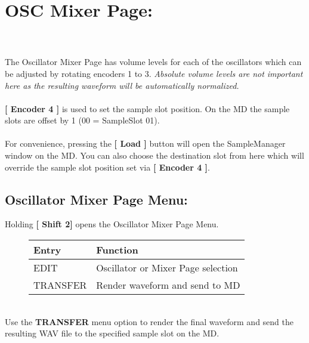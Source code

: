 \section{OSC Mixer Page:}
\\\\
The Oscillator Mixer Page has volume levels for each of the oscillators which can be adjusted by rotating encoders 1 to 3. \textit{Absolute volume levels are not important here as the resulting waveform will be automatically normalized.}\\
\\\textbf{[ Encoder 4 ]} is used to set the sample slot position. On the MD the sample slots are offset by 1 (00 = SampleSlot 01).\\
\\
For convenience, pressing the \textbf{[ Load ]} button will open the SampleManager window on the MD. You can also choose the destination slot from here which will override the sample slot position set via \textbf{[ Encoder 4 ]}.

\newpage
\subsection{Oscillator Mixer Page Menu:}
Holding \textbf{[ Shift 2]} opens the Oscillator Mixer Page Menu.
\begin{figure}[hb]
    \begin{tabular}{|l|l|}
    \hline
    \rowcolor[HTML]{C0C0C0}
    Entry     & Function \\ \hline
    EDIT      & Oscillator or Mixer Page selection \\ \hline
    TRANSFER  & Render waveform and send to MD\\ \hline
    \end{tabular}
\end{figure}
\\
Use the \textbf{TRANSFER} menu option to render the final waveform and send the resulting WAV file to the specified sample slot on the MD.